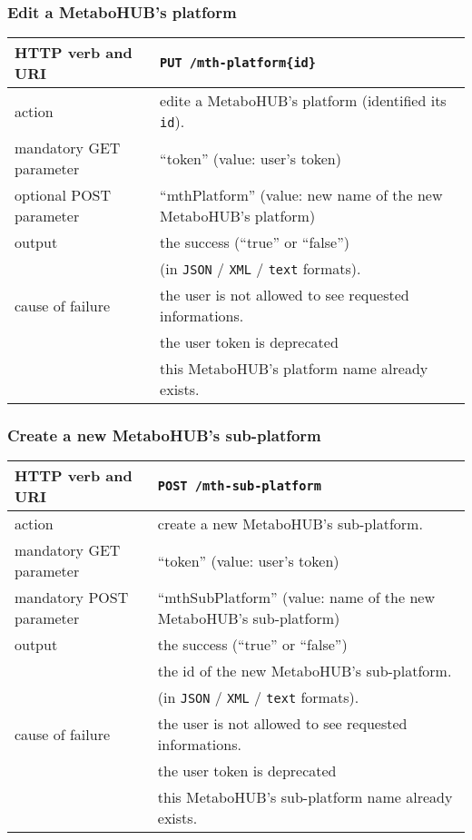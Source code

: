 \subsubsection{Edit a MetaboHUB's platform}
\begin{tabular}{ | l | l | }
	\hline
	HTTP verb and URI & \texttt{PUT /mth-platform\{id\}} \\
	\hline
	action & edite a MetaboHUB's platform (identified \via its \texttt{id}). \\
	\hline
	mandatory GET parameter & ``token'' (value: user's token) \\
	\hline
	optional POST parameter & ``mthPlatform'' (value: new name of the new MetaboHUB's platform) \\
	\hline
	output & the success (``true'' or ``false'')  \\
	\space & (in \texttt{JSON} / \texttt{XML} / \texttt{text} formats). \\
	\hline
	cause of failure & the user is not allowed to see requested informations. \\
	\space & the user token is deprecated \\
	\space & this MetaboHUB's platform name already exists. \\
	\hline
\end{tabular}
\newline

\subsubsection{Create a new MetaboHUB's sub-platform}
\begin{tabular}{ | l | l | }
	\hline
	HTTP verb and URI & \texttt{POST /mth-sub-platform} \\
	\hline
	action & create a new MetaboHUB's sub-platform. \\
	\hline
	mandatory GET parameter & ``token'' (value: user's token) \\
	\hline
	mandatory POST parameter & ``mthSubPlatform'' (value: name of the new MetaboHUB's sub-platform) \\
	\hline
	output & the success (``true'' or ``false'')  \\
	\space & the id of the new MetaboHUB's sub-platform.  \\
	\space & (in \texttt{JSON} / \texttt{XML} / \texttt{text} formats). \\
	\hline
	cause of failure & the user is not allowed to see requested informations. \\
	\space & the user token is deprecated \\
	\space & this MetaboHUB's sub-platform name already exists. \\
	\hline
\end{tabular}
\newline


